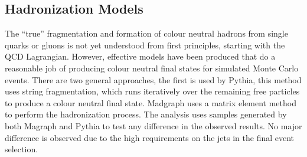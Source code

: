 \subsection{Hadronization Models} %
\label{sub:hadronization_models}
The ``true'' fragmentation and formation of colour neutral hadrons from single 
quarks or gluons is not yet understood from first principles, starting with the 
QCD Lagrangian. However, effective models have been produced that do a 
reasonable job of producing colour neutral final states for simulated Monte 
Carlo events. There are two general approaches, the first is used by 
Pythia\cite{pythia}, this method uses string fragmentation, which runs 
iteratively over the remaining free particles to produce a colour neutral final 
state. Madgraph\cite{madgraph} uses a matrix element method to perform the 
hadronization process. The analysis uses samples generated by both Magraph and 
Pythia to test any difference in the observed results. No major difference is 
observed due to the high \ET requirements on the jets in the final event 
selection.


